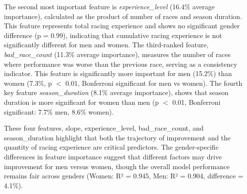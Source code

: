 \documentclass[suppldata]{interact}
\theoremstyle{plain}%
\theoremstyle{definition}
\theoremstyle{remark}
\begin{document}
The second most important feature is \textit{experience\_level} (16.4\% average importance), calculated as the product of number of races and season duration. This feature represents total racing experience and shows no significant gender difference (p = 0.99), indicating that cumulative racing experience is not significantly different for men and women. The third-ranked feature, \textit{bad\_race\_count} (11.3\% average importance), measures the number of races where performance was worse than the previous race, serving as a consistency indicator. This feature is significantly more important for men (15.2\%) than women (7.3\%, p $<$ 0.01, Bonferroni significant for men vs women). The fourth key feature \textit{season\_duration} (8.1\% average importance), shows that season duration is more significant for women than men (p $<$ 0.01, Bonferroni significant: 7.7\% men, 8.6\% women).

These four features, slope, experience\_level, bad\_race\_count, and season\_duration highlight that both the trajectory of improvement and the quantity of racing experience are critical predictors. The gender-specific differences in feature importance suggest that different factors may drive improvement for men versus women, though the overall model performance remains fair across genders (Women: R² = 0.945, Men: R² = 0.904, difference = 4.1\%).
\end{document}
